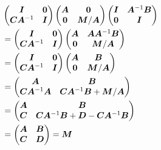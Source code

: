 \documentclass[twoside,10pt]{article}
\begin{document}
  \begin{align*}
    &\begin{pmatrix}
      \bm{I} & \bm{0} \\
      \bm{C} \bm{A}^{-1} & \bm{I}
    \end{pmatrix}
    \begin{pmatrix}
      \bm{A} & \bm{0} \\
      \bm{0} &\bm{M} / \bm{A}
    \end{pmatrix}
    \begin{pmatrix}
      \bm{I} & \bm{A}^{-1} \bm{B} \\
      \bm{0} & \bm{I}
    \end{pmatrix}\\
    &= 
    \begin{pmatrix}
      \bm{I} & \bm{0} \\
      \bm{C} \bm{A}^{-1} & \bm{I}
    \end{pmatrix}
    \begin{pmatrix}
      \bm{A} & \bm{A} \bm{A}^{-1} \bm{B} \\
      \bm{0} & \bm{M} / \bm{A}
    \end{pmatrix}\\
    &= 
    \begin{pmatrix}
      \bm{I} & \bm{0} \\
      \bm{C} \bm{A}^{-1} & \bm{I}
    \end{pmatrix}
    \begin{pmatrix}
      \bm{A} & \bm{B} \\
      \bm{0} & \bm{M} / \bm{A}
    \end{pmatrix}\\
    &=
    \begin{pmatrix}
      \bm{A} & \bm{B}\\
      \bm{C}\bm{A}^{-1}\bm{A} & \bm{C}\bm{A}^{-1}\bm{B} + \bm{M} / \bm{A}
    \end{pmatrix}\\
    &=
    \begin{pmatrix}
      \bm{A} & \bm{B}\\
      \bm{C} & \bm{C}\bm{A}^{-1}\bm{B} + \bm{D} - \bm{C} \bm{A}^{-1} \bm{B}
    \end{pmatrix}\\
    &=
    \begin{pmatrix}
      \bm{A} & \bm{B}\\
      \bm{C} & \bm{D}
    \end{pmatrix} = \bm{M}
  \end{align*}
\end{document}
